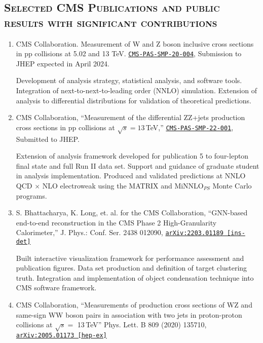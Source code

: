 \documentclass[10pt]{res} %
\begin{document}
\begin{resume}

\section{\textsc{Selected CMS Publications and public results with significant contributions}}
\begin{enumerate}
  \item CMS Collaboration. Measurement of W and Z boson inclusive cross sections in pp collisions at 5.02 and 13 TeV. 
    \href{https://cds.cern.ch/record/2868090}{\texttt{CMS-PAS-SMP-20-004}}, Submission to JHEP expected in April 2024.

    Development of analysis strategy, statistical analysis, and software tools. Integration of next-to-next-to-leading order (NNLO) simulation.
    Extension of analysis to differential distributions for validation of theoretical predictions.

  \item CMS Collaboration, ``Measurement of the differential ZZ+jets production cross sections in pp collisions at $\sqrt{s} = 13$\,TeV,'' 
    \href{https://cds.cern.ch/record/2859350}{\texttt{CMS-PAS-SMP-22-001}}, Submitted to JHEP.

    Extension of analysis framework developed for publication 5 to four-lepton final state and full Run II data set.
    Support and guidance of graduate student in analysis implementation. 
    Produced and validated predictions at NNLO QCD $\times$ NLO electroweak using the MATRIX 
    and MiNNLO$_{PS}$ Monte Carlo programs.

  \item S. Bhattacharya, K. Long, et. al. for the CMS Collaboration, ``GNN-based end-to-end reconstruction in the CMS Phase 2 High-Granularity Calorimeter,'' J. Phys.: Conf. Ser. 2438 012090, \href{https://arxiv.org/abs/2203.01189}{\texttt{arXiv:2203.01189 [ins-det]}} 

    Built interactive visualization framework for performance assessment and publication figures.
    Data set production and definition of target clustering truth. 
    Integration and implementation of object condensation technique into CMS software framework. 
     
  \item CMS Collaboration, ``Measurements of production cross sections of WZ and same-sign WW boson pairs in association with two jets in proton-proton collisions at $\sqrt{s} =$ 13\,TeV'' Phys. Lett. B 809 (2020) 135710, \href{https://arxiv.org/abs/2005.01173}{\texttt{arXiv:2005.01173 [hep-ex]}}


\end{enumerate}
\end{resume}
\end{document}

